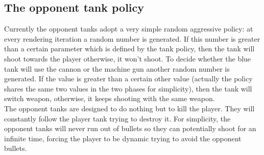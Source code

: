 \documentclass[14pt]{article}
\begin{document}
\subsection{The opponent tank policy}
Currently the opponent tanks adopt a very simple random aggressive policy: at every rendering iteration a random number is generated. If this number is greater than a certain parameter which is defined by the tank policy, then the tank will shoot towards the player otherwise, it won't shoot. To decide whether the blue tank will use the cannon or the machine gun another random number is generated. If the value is greater than a certain other value (actually the policy shares the same two values in the two phases for simplicity), then the tank will switch weapon, otherwise, it keeps shooting with the same weapon. \\
The opponent tanks are designed to do nothing but to kill the player. They will constantly follow the player tank trying to destroy it. For simplicity, the opponent tanks will never run out of bullets so they can potentially shoot for an infinite time, forcing the player to be dynamic trying to avoid the opponent bullets.\\
\end{document}
